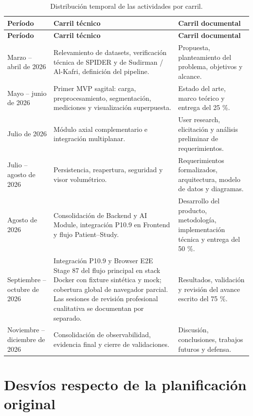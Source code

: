 \begingroup
\scriptsize
\setlength{\tabcolsep}{3pt}
\renewcommand{\arraystretch}{1.16}
\begin{longtable}{|>{\raggedright\arraybackslash}p{}|>{\raggedright\arraybackslash}p{}|>{\raggedright\arraybackslash}p{}|}
\caption{Distribución temporal de las actividades por carril.}\label{tab:anexo-a-actividades}\\
\hline
\textbf{Período} & \textbf{Carril técnico} & \textbf{Carril documental} \\
\hline
\endfirsthead
\hline
\textbf{Período} & \textbf{Carril técnico} & \textbf{Carril documental} \\
\hline
\endhead
Marzo – abril de 2026 & Relevamiento de datasets, verificación técnica de SPIDER y de Sudirman / Al-Kafri, definición del pipeline. & Propuesta, planteamiento del problema, objetivos y alcance. \\
\hline
Mayo – junio de 2026 & Primer MVP sagital: carga, preprocesamiento, segmentación, mediciones y visualización superpuesta. & Estado del arte, marco teórico y entrega del 25 \%. \\
\hline
Julio de 2026 & Módulo axial complementario e integración multiplanar. & User research, elicitación y análisis preliminar de requerimientos. \\
\hline
Julio – agosto de 2026 & Persistencia, reapertura, seguridad y visor volumétrico. & Requerimientos formalizados, arquitectura, modelo de datos y diagramas. \\
\hline
Agosto de 2026 & Consolidación de Backend y AI Module, integración P10.9 en Frontend y flujo Patient--Study. & Desarrollo del producto, metodología, implementación técnica y entrega del 50 \%. \\
\hline
Septiembre – octubre de 2026 & Integración P10.9 y Browser E2E Stage 87 del flujo principal en stack Docker con fixture sintética y mock; cobertura global de navegador parcial. Las sesiones de revisión profesional cualitativa se documentan por separado. & Resultados, validación y revisión del avance escrito del 75 \%. \\
\hline
Noviembre – diciembre de 2026 & Consolidación de observabilidad, evidencia final y cierre de validaciones. & Discusión, conclusiones, trabajos futuros y defensa. \\
\hline
\end{longtable}
\endgroup

\section{Desvíos respecto de la planificación original}


